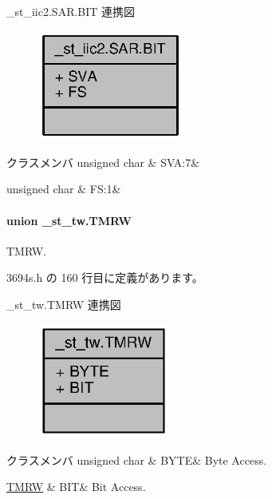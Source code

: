 \+\_\+st\+\_\+iic2.\+S\+A\+R.\+B\+I\+T 連携図
\nopagebreak
\begin{figure}[H]
\begin{center}
\leavevmode
\includegraphics[width=136pt]{d0/d34/struct__st__iic2_8SAR_8BIT__coll__graph}
\end{center}
\end{figure}
\begin{DoxyFields}{クラスメンバ}
unsigned char\label{3694s_8h_abed610484e27203ea260dc59e683fcfe}
&
S\+V\+A\+:7&
\\
\hline

unsigned char\label{3694s_8h_a4a436c564cf21ff91983ab79399fa185}
&
F\+S\+:1&
\\
\hline

\end{DoxyFields}
\label{union__st__tw_8TMRW}
\paragraph{union \+\_\+st\+\_\+tw.\+T\+M\+R\+W}
T\+M\+R\+W. 

 3694s.\+h の 160 行目に定義があります。



\+\_\+st\+\_\+tw.\+T\+M\+R\+W 連携図
\nopagebreak
\begin{figure}[H]
\begin{center}
\leavevmode
\includegraphics[width=123pt]{d2/d7d/union__st__tw_8TMRW__coll__graph}
\end{center}
\end{figure}
\begin{DoxyFields}{クラスメンバ}
unsigned char\label{3694s_8h_ae409eb2ba6eb6801f52763ae370c350e}
&
B\+Y\+T\+E&
Byte Access. \\
\hline

\hyperlink{3694s_8h_d3/d31/struct__st__tw_8TMRW_8BIT}{T\+M\+R\+W}\label{3694s_8h_adb957fdc8000e1eef04a243f5199aa52}
&
B\+I\+T&
Bit Access. \\
\hline

\end{DoxyFields}
\label{struct__st__tw_8TMRW_8BIT}
